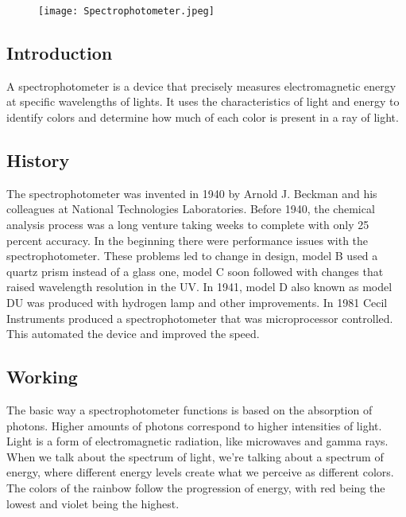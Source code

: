 \documentclass[12pt]{article}
\begin{document}
\begin{figure}[h]
\texttt{[image: Spectrophotometer.jpeg]}
\centering
\end{figure}


\subsection{Introduction}

A spectrophotometer is a device that precisely measures electromagnetic energy at specific wavelengths of lights. It uses the characteristics of light and energy to identify colors and determine how much of each color is present in a ray of light.


\subsection{History}

The spectrophotometer was invented in 1940 by Arnold J. Beckman and his colleagues at National Technologies Laboratories. Before 1940, the chemical analysis process was a long venture taking weeks to complete with only 25 percent accuracy. In the beginning there were performance issues with the spectrophotometer. These problems led to change in design, model B used a quartz prism instead of a glass one, model C soon followed with changes that raised wavelength resolution in the UV. In 1941, model D also known as model DU was produced with hydrogen lamp and other improvements. In 1981 Cecil Instruments produced a spectrophotometer that was microprocessor controlled. This automated the device and improved the speed.


\subsection{Working}

The basic way a spectrophotometer functions is based on the absorption of photons. Higher amounts of photons correspond to higher intensities of light. Light is a form of electromagnetic radiation, like microwaves and gamma rays. When we talk about the spectrum of light, we’re talking about a spectrum of energy, where different energy levels create what we perceive as different colors. The colors of the rainbow follow the progression of energy, with red being the lowest and violet being the highest.
\end{document}
